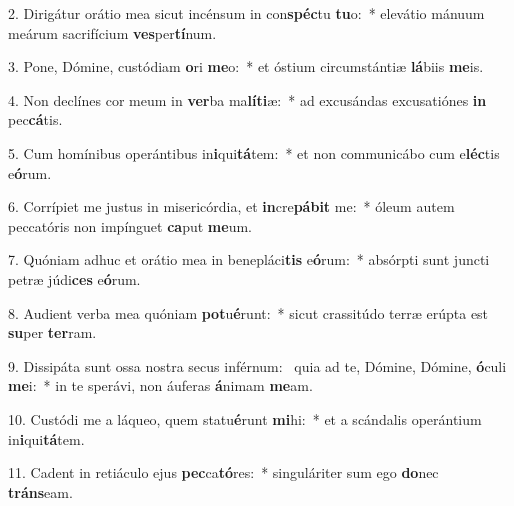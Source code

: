 2. Dirigátur orátio mea sicut incénsum in con\textbf{spéc}tu \textbf{tu}o:~*  elevátio mánuum meárum sacrifícium \textbf{ves}per\textbf{tí}num.\

3. Pone, Dómine, custódiam \textbf{o}ri \textbf{me}o:~*  et óstium circumstántiæ \textbf{lá}biis \textbf{me}is.\

4. Non declínes cor meum in \textbf{ver}ba ma\textbf{lí}\textbf{ti}æ:~*  ad excusándas excusatiónes \textbf{in} pec\textbf{cá}tis.\

5. Cum homínibus operántibus in\textbf{i}qui\textbf{tá}tem:~*  et non communicábo cum e\textbf{léc}tis e\textbf{ó}rum.\

6. Corrípiet me justus in misericórdia, et \textbf{in}cre\textbf{pá}\textbf{bit} me:~*  óleum autem peccatóris non impínguet \textbf{ca}put \textbf{me}um.\

7. Quóniam adhuc et orátio mea in benepláci\textbf{tis} e\textbf{ó}rum:~*  absórpti sunt juncti petræ júdi\textbf{ces} e\textbf{ó}rum.\

8. Audient verba mea quóniam \textbf{pot}u\textbf{é}runt:~*  sicut crassitúdo terræ erúpta est \textbf{su}per \textbf{ter}ram.\

9. Dissipáta sunt ossa nostra secus inférnum: \dag\  quia ad te, Dómine, Dómine, \textbf{ó}culi \textbf{me}i:~*  in te sperávi, non áuferas \textbf{á}nimam \textbf{me}am.\

10. Custódi me a láqueo, quem statu\textbf{é}runt \textbf{mi}hi:~*  et a scándalis operántium in\textbf{i}qui\textbf{tá}tem.\

11. Cadent in retiáculo ejus \textbf{pec}ca\textbf{tó}res:~*  singuláriter sum ego \textbf{do}nec \textbf{tráns}eam.\

